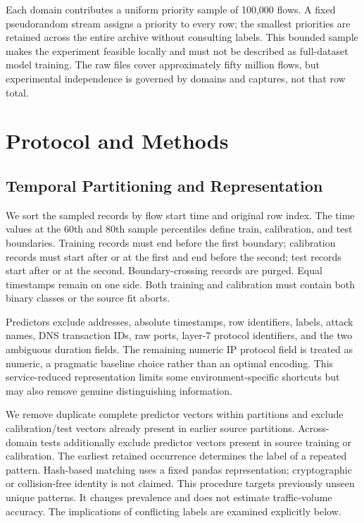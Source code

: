 \documentclass[manuscript,screen,nonacm]{acmart}
\begin{document}
Each domain contributes a uniform priority sample of 100,000 flows. A fixed pseudorandom stream assigns a priority to every row; the smallest priorities are retained across the entire archive without consulting labels. This bounded sample makes the experiment feasible locally and must not be described as full-dataset model training. The raw files cover approximately fifty million flows, but experimental independence is governed by domains and captures, not that row total.

\section{Protocol and Methods}
\subsection{Temporal Partitioning and Representation}
We sort the sampled records by flow start time and original row index. The time values at the 60th and 80th sample percentiles define train, calibration, and test boundaries. Training records must end before the first boundary; calibration records must start after or at the first and end before the second; test records start after or at the second. Boundary-crossing records are purged. Equal timestamps remain on one side. Both training and calibration must contain both binary classes or the source fit aborts.

Predictors exclude addresses, absolute timestamps, row identifiers, labels, attack names, DNS transaction IDs, raw ports, layer-7 protocol identifiers, and the two ambiguous duration fields. The remaining numeric IP protocol field is treated as numeric, a pragmatic baseline choice rather than an optimal encoding. This service-reduced representation limits some environment-specific shortcuts but may also remove genuine distinguishing information.

We remove duplicate complete predictor vectors within partitions and exclude calibration/test vectors already present in earlier source partitions. Across-domain tests additionally exclude predictor vectors present in source training or calibration. The earliest retained occurrence determines the label of a repeated pattern. Hash-based matching uses a fixed pandas representation; cryptographic or collision-free identity is not claimed. This procedure targets previously unseen unique patterns. It changes prevalence and does not estimate traffic-volume accuracy. The implications of conflicting labels are examined explicitly below.
\end{document}
